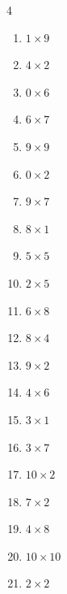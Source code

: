 \begin{multicols}{4}
\begin{enumerate}
  \item $1\times 9$
        \phantom{$=9$}

  \item $4\times 2$
        \phantom{$=8$}

  \item $0\times 6$
        \phantom{$=0$}

  \item $6\times 7$
        \phantom{$=42$}

  \item $9\times 9$
        \phantom{$=81$}

  \item $0\times 2$
        \phantom{$=0$}

  \item $9\times 7$
        \phantom{$=63$}

  \item $8\times 1$
        \phantom{$=8$}

  \item $5\times 5$
        \phantom{$=25$}

  \item $2\times 5$
        \phantom{$=10$}

  \item $6\times 8$
        \phantom{$=48$}

  \item $8\times 4$
        \phantom{$=32$}

  \item $9\times 2$
        \phantom{$=18$}

  \item $4\times 6$
        \phantom{$=24$}

  \item $3\times 1$
        \phantom{$=3$}

  \item $3\times 7$
        \phantom{$=21$}

  \item $10\times 2$
        \phantom{$=20$}

  \item $7\times 2$
        \phantom{$=14$}

  \item $4\times 8$
        \phantom{$=32$}

  \item $10\times 10$
        \phantom{$=100$}

  \item $2\times 2$
        \phantom{$=4$}


\end{enumerate}
\end{multicols}
